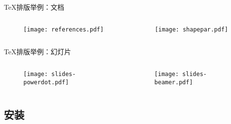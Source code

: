 \begin{frame}{\TeX{}排版举例：文档}
  \begin{columns}
    \begin{column}{.45\textwidth}
      \begin{figure}[h]
        \centering
        \texttt{[image: references.pdf]}
      \end{figure}
    \end{column}
    \begin{column}{.45\textwidth}
      \begin{figure}[h]
        \centering
        \texttt{[image: shapepar.pdf]}
      \end{figure}
    \end{column}
  \end{columns}
\end{frame}

\begin{frame}{\TeX{}排版举例：幻灯片}
  \begin{columns}
    \begin{column}{.45\textwidth}
      \begin{figure}[h]
        \centering
        \texttt{[image: slides-powerdot.pdf]}
      \end{figure}
    \end{column}
    \begin{column}{.45\textwidth}
      \begin{figure}[h]
        \centering
        \texttt{[image: slides-beamer.pdf]}
      \end{figure}
    \end{column}
  \end{columns}
\end{frame}

\subsection{安装}

